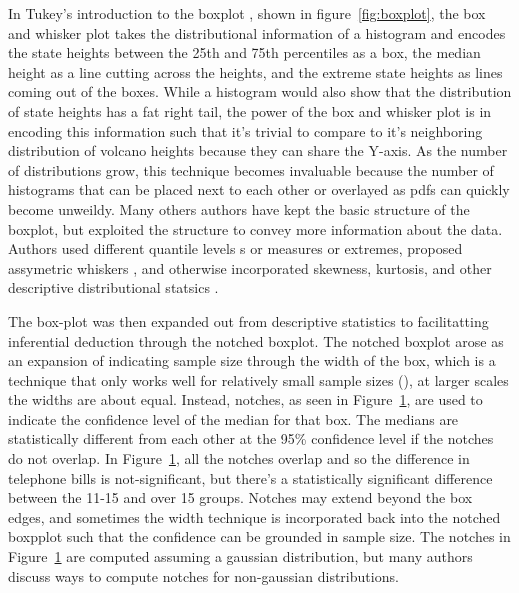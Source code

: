 In Tukey's introduction to the boxplot \cite{tukey77e}, shown in
figure~\ref{fig:boxplot}, the box and whisker plot takes the distributional information of a histogram and encodes the state heights between the
25th and 75th percentiles as a box, the median height as a line cutting across
the heights, and the extreme state heights as lines coming out of the
boxes. While a histogram would also show that the distribution of state heights has a fat right tail,
the power of the box and whisker plot is in encoding this information such that
it's trivial to compare to it's neighboring distribution of volcano
heights because they can share the Y-axis. As the number of distributions grow,
this technique becomes invaluable because the number of histograms that can be
placed next to each other or overlayed as pdfs can quickly become
unweildy.  Many others authors have kept the basic structure of the boxplot,
but exploited the structure to convey more information about the data. Authors used
different quantile levels \cite{Hyndman}s or measures or extremes\cite{Frigge,
carter}, proposed assymetric whiskers \cite{Rousseuw}, and otherwise incorporated skewness, kurtosis, and other descriptive distributional statsics \cite{ Aslam, choon, Marmelejo}.


\begin{figure}
\label{fig:notched}
\end{figure}
The box-plot was then expanded out from descriptive statistics to facilitatting
inferential deduction through the notched boxplot. \cite{mcgill1978} The notched boxplot
arose as an expansion of indicating sample size through the width of the box,
which is a technique that only works well for relatively small sample sizes (), at larger scales the widths are about equal. Instead, notches, as seen
in Figure~\ref{fig:notched}, are used to indicate the confidence level of the
median for that box. The medians are statistically different from each other at
the 95\% confidence level if the notches do not overlap. In
Figure~\ref{fig:notched}, all the notches overlap %
and so the difference in telephone bills is not-significant, but there's a
statistically significant difference between the 11-15 and over 15 groups. Notches may extend
beyond the box edges, and sometimes the width technique is incorporated back
into the notched boxpplot such that the confidence can be grounded in sample
size. The notches in Figure~\ref{fig:notched} are computed assuming a gaussian
distribution, but many authors \cite{x,y,z} discuss ways to compute notches for
non-gaussian distributions. 


